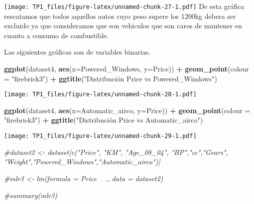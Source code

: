 \documentclass[
]{article}
\newenvironment{Shaded}{\begin{snugshade}}{\end{snugshade}}
\newcommand{\CommentTok}[1]{\textcolor[rgb]{0.56,0.35,0.01}{\textit{#1}}}
\newcommand{\DataTypeTok}[1]{\textcolor[rgb]{0.13,0.29,0.53}{#1}}
\newcommand{\KeywordTok}[1]{\textcolor[rgb]{0.13,0.29,0.53}{\textbf{#1}}}
\newcommand{\NormalTok}[1]{#1}
\newcommand{\OperatorTok}[1]{\textcolor[rgb]{0.81,0.36,0.00}{\textbf{#1}}}
\newcommand{\StringTok}[1]{\textcolor[rgb]{0.31,0.60,0.02}{#1}}
\begin{document}
\texttt{[image: TP1\_files/figure-latex/unnamed-chunk-27-1.pdf]} De esta
gráfica rescatamos que todos aquellos autos cuyo peso supere los 1200kg
debera ser excluido ya que consideramos que son vehiculos que son caros
de mantener en cuanto a consumo de combustible.

Las siguientes gráficas son de variables binarias.

\begin{Shaded}
\begin{Highlighting}[]
\KeywordTok{ggplot}\NormalTok{(dataset4, }\KeywordTok{aes}\NormalTok{(}\DataTypeTok{x=}\NormalTok{Powered_Windows, }\DataTypeTok{y=}\NormalTok{Price)) }\OperatorTok{+}\StringTok{ }\KeywordTok{geom_point}\NormalTok{(}\DataTypeTok{colour =} \StringTok{"firebrick3"}\NormalTok{) }\OperatorTok{+}
\StringTok{        }\KeywordTok{ggtitle}\NormalTok{(}\StringTok{"Distribución Price vs Powered_Windows"}\NormalTok{)}
\end{Highlighting}
\end{Shaded}

\texttt{[image: TP1\_files/figure-latex/unnamed-chunk-28-1.pdf]}

\begin{Shaded}
\begin{Highlighting}[]
\KeywordTok{ggplot}\NormalTok{(dataset4, }\KeywordTok{aes}\NormalTok{(}\DataTypeTok{x=}\NormalTok{Automatic_airco, }\DataTypeTok{y=}\NormalTok{Price)) }\OperatorTok{+}\StringTok{ }\KeywordTok{geom_point}\NormalTok{(}\DataTypeTok{colour =} \StringTok{"firebrick3"}\NormalTok{) }\OperatorTok{+}
\StringTok{        }\KeywordTok{ggtitle}\NormalTok{(}\StringTok{"Distribución Price vs Automatic_airco"}\NormalTok{)}
\end{Highlighting}
\end{Shaded}

\texttt{[image: TP1\_files/figure-latex/unnamed-chunk-29-1.pdf]}

\begin{Shaded}
\begin{Highlighting}[]
\CommentTok{#dataset2 <- dataset[c("Price", "KM", "Age_08_04", "HP","cc","Gears", "Weight","Powered_Windows","Automatic_airco")]}
\end{Highlighting}
\end{Shaded}

\begin{Shaded}
\begin{Highlighting}[]
\CommentTok{#mlr3 <- lm(formula = Price ~ ., data =  dataset2)}

\CommentTok{#summary(mlr3)}
\end{Highlighting}
\end{Shaded}
\end{document}
